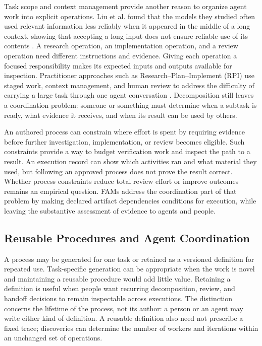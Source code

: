 \documentclass[letterpaper]{article}
\theoremstyle{definition}
\begin{document}
Task scope and context management provide another reason to organize agent
work into explicit operations. Liu et al. found that the models they studied
often used relevant information less reliably when it appeared in the middle
of a long context, showing that accepting a long input does not ensure
reliable use of its contents \cite{liu2023lostmiddle}. A research operation, an implementation
operation, and a review operation need different instructions and evidence.
Giving each operation a focused responsibility makes its expected inputs and
outputs available for inspection. Practitioner approaches such as
Research--Plan--Implement (RPI) use staged work, context management, and human
review to address the difficulty of carrying a large task through one agent
conversation \cite{dex2025context}. Decomposition still leaves a coordination
problem: someone or something must determine when a subtask is ready, what
evidence it receives, and when its result can be used by others.

An authored process can constrain where effort is spent by requiring evidence
before further investigation, implementation, or review becomes eligible.
Such constraints provide a way to budget verification work and inspect the
path to a result. An execution record can show which activities ran and what
material they used, but following an approved process does not prove the
result correct. Whether process constraints reduce total review effort or
improve outcomes remains an empirical question. FAMs address the coordination
part of that problem by making declared artifact dependencies conditions for
execution, while leaving the substantive assessment of evidence to agents
and people.

\subsection{Reusable Procedures and Agent Coordination}

A process may be generated for one task or retained as a versioned definition
for repeated use. Task-specific generation can be appropriate when the work is
novel and maintaining a reusable procedure would add little value. Retaining
a definition is useful when people want recurring decomposition, review, and
handoff decisions to remain inspectable across executions. The distinction
concerns the lifetime of the process, not its author: a person or an agent may
write either kind of definition. A reusable definition also need not prescribe
a fixed trace; discoveries can determine the number of workers and iterations
within an unchanged set of operations.
\end{document}
